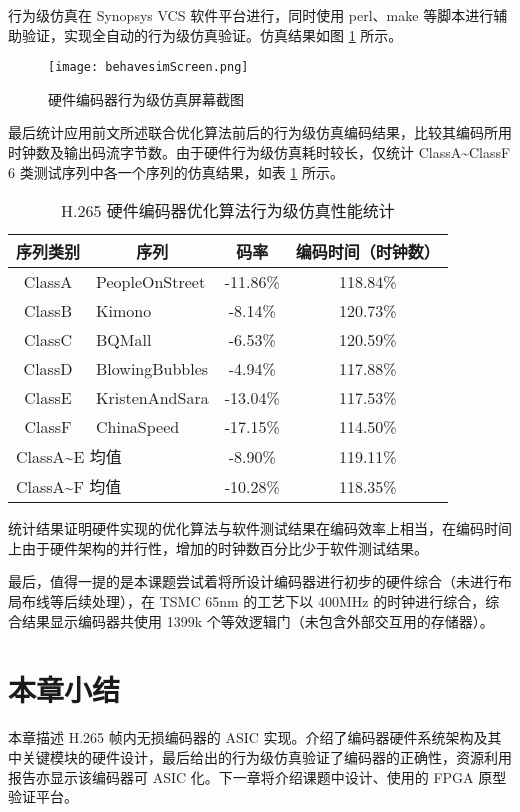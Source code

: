 行为级仿真在 Synopsys VCS 软件平台进行，同时使用 perl、make 等脚本进行辅助验证，实现全自动的行为级仿真验证。仿真结果如图 \ref{fig:behavesimScreen} 所示。
\begin{figure}[hbt]
    \centering
    \texttt{[image: behavesimScreen.png]}
    \caption{硬件编码器行为级仿真屏幕截图}
    \label{fig:behavesimScreen}
\end{figure}

最后统计应用前文所述联合优化算法前后的行为级仿真编码结果，比较其编码所用时钟数及输出码流字节数。由于硬件行为级仿真耗时较长，仅统计 ClassA\textasciitilde ClassF 6 类测试序列中各一个序列的仿真结果，如表 \ref{tab:behavesimTab} 所示。
\begin{table}[hbt]
    \centering
    \caption{H.265 硬件编码器优化算法行为级仿真性能统计}
    \label{tab:behavesimTab}
    \begin{tabular}{@{}clcc@{}}
        \toprule
        序列类别                                         & \multicolumn{1}{c}{序列} & 码率     & 编码时间（时钟数） \\ \midrule
        ClassA                                           & PeopleOnStreet           & -11.86\% & 118.84\%           \\
        ClassB                                           & Kimono                   & -8.14\%  & 120.73\%           \\
        ClassC                                           & BQMall                   & -6.53\%  & 120.59\%           \\
        ClassD                                           & BlowingBubbles           & -4.94\%  & 117.88\%           \\
        ClassE                                           & KristenAndSara           & -13.04\% & 117.53\%           \\
        ClassF                                           & ChinaSpeed               & -17.15\% & 114.50\%           \\ \midrule
        \multicolumn{2}{l}{ClassA\textasciitilde E 均值} & -8.90\%                  & 119.11\%                      \\ \midrule
        \multicolumn{2}{l}{ClassA\textasciitilde F 均值} & -10.28\%                 & 118.35\%                      \\ \bottomrule
    \end{tabular}
\end{table}

统计结果证明硬件实现的优化算法与软件测试结果在编码效率上相当，在编码时间上由于硬件架构的并行性，增加的时钟数百分比少于软件测试结果。

最后，值得一提的是本课题尝试着将所设计编码器进行初步的硬件综合（未进行布局布线等后续处理），在 TSMC 65nm 的工艺下以 400MHz 的时钟进行综合，综合结果显示编码器共使用 1399k 个等效逻辑门（未包含外部交互用的存储器）。

\section{本章小结}
本章描述 H.265 帧内无损编码器的 ASIC 实现。介绍了编码器硬件系统架构及其中关键模块的硬件设计，最后给出的行为级仿真验证了编码器的正确性，资源利用报告亦显示该编码器可 ASIC 化。下一章将介绍课题中设计、使用的 FPGA 原型验证平台。